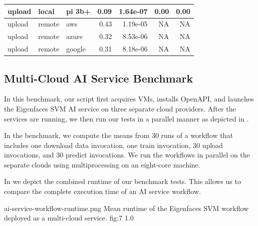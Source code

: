 \begin{table}[htb]
{\begin{tabular}{lllrrrr}
            upload &   local &    pi 3b+ &    0.09 & 1.64e-07 &                0.00 &             0.00 \\
\midrule
            upload &  remote &       aws &    0.43 & 1.19e-05 &                 NA &              NA \\
            upload &  remote &     azure &    0.32 & 8.53e-06 &                 NA &              NA \\
            upload &  remote &    google &    0.31 & 8.18e-06 &                 NA &              NA \\
\bottomrule
\end{tabular}
}
\end{table}

\subsection{Multi-Cloud AI Service Benchmark}
\label{sec-multi-benchmark}

In this benchmark, our script first acquires VMs, installs \Cloudmesh
OpenAPI, and launches the Eigenfaces SVM AI service on three separate
cloud providers.  After the
services are running, we then run our tests in a parallel manner as
depicted in . 

In the benchmark, we compute the means from 30 runs of a workflow that
includes one download data invocation, one train invocation, 30 upload
invocations, and 30 predict invocations. We run the workflows in
parallel on the separate clouds using multiprocessing on an eight-core
machine.

In  we depict the combined runtime of our benchmark
tests. This allows us to compare the complete execution time of an AI
service workflow.

\OneFIGURE
    {ai-service-workflow-runtime.png}
    {Mean runtime of the Eigenfaces SVM workflow deployed
     as a multi-cloud service.}
    {fig:7}
    {1.0}
    
